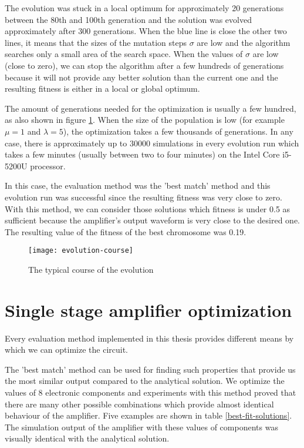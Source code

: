 The evolution was stuck in a local optimum for approximately 20 generations between the 80th and 100th generation and the solution was evolved approximately after 300 generations. When the blue line is close the other two lines, it means that the sizes of the mutation steps $\sigma$ are low and the algorithm searches only a small area of the search space. When the values of $\sigma$ are low (close to zero), we can stop the algorithm after a few hundreds of generations because it will not provide any better solution than the current one and the resulting fitness is either in a local or global optimum.

The amount of generations needed for the optimization is usually a few hundred, as also shown in figure \ref{evolution-course}. When the size of the population is low (for example $\mu = 1$ and $\lambda = 5$), the optimization takes a few thousands of generations. In any case, there is approximately up to 30000 simulations in every evolution run which takes a few minutes (usually between two to four minutes) on the Intel Core i5-5200U processor.

In this case, the evaluation method was the 'best match' method and this evolution run was successful since the resulting fitness was very close to zero. With this method, we can consider those solutions which fitness is under 0.5 as sufficient because the amplifier's output waveform is very close to the desired one. The resulting value of the fitness of the best chromosome was 0.19.

\begin{figure}[H]
    \centerline{\texttt{[image: evolution-course]}
    \label{evolution-course}}
    \caption{The typical course of the evolution}
\end{figure}

\section{Single stage amplifier optimization} \label{single-stage-results}
Every evaluation method implemented in this thesis provides different means by which we can optimize the circuit.

The 'best match' method can be used for finding such properties that provide us the most similar output compared to the analytical solution. We optimize the values of 8 electronic components and experiments with this method proved that there are many other possible combinations which provide almost identical behaviour of the amplifier. Five examples are shown in table \ref{best-fit-solutions}. The simulation output of the amplifier with these values of components was visually identical with the analytical solution.


